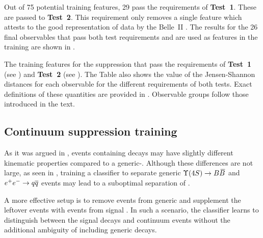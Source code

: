 Out of 75 potential training features, 29 pass the requirements of \textbf{Test~1}.
These are passed to \textbf{Test~2}.
This requirement only removes a single feature which attests to the good representation of data by the Belle~II \MC.
The results for the 26 final observables that pass both test requirements and are used as features in the \BDT training
are shown in .

\begin{table}[htbp!]
    \centering
    \caption{\label{tab:passing_test1}The training features for the \epem\ra\qqbar suppression
    that pass the requirements of \textbf{Test~1} (see ) and \textbf{Test~2} (see ).
    The Table also shows the value of the Jensen-Shannon distances for each observable for the different requirements of both tests.
    Exact definitions of these quantities are provided in .
    Observable groups follow those introduced in the text.
    }   
    
\end{table}

\subsection{Continuum suppression training}\label{sec:continuum_training}

As it was argued in , events containing \BtoXsgamma decays may have slightly different kinematic properties compared to a generic-\BB.
Although these differences are not large, as seen in , training a classifier to separate generic \mbox{$\FourS\ra\BB$} and \mbox{$e^+e^-\rightarrow q\overline q$} events may lead to a suboptimal separation of \BtoXsgamma.

A more effective setup is to remove \BB events from generic \MC and supplement the leftover events with \BtoXsgamma events from signal \MC. 
In such a scenario, the classifier learns to distinguish between the signal decays and continuum events without the additional ambiguity of including generic \BB decays.

